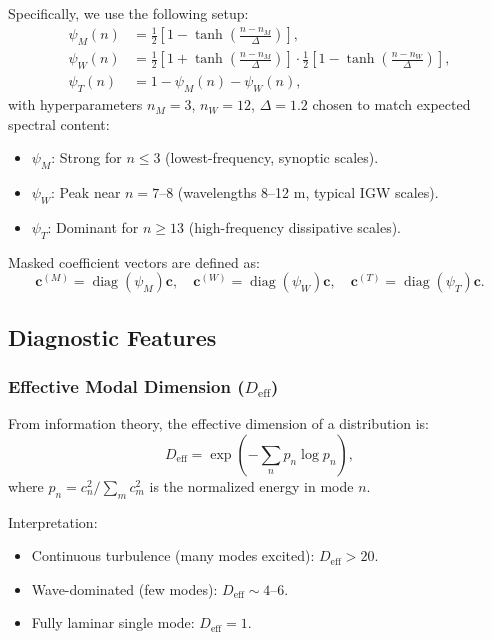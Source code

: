 \documentclass[11pt,a4paper]{article}
\begin{document}
Specifically, we use the following setup:
\begin{align}
\psi_M(n) &= \frac{1}{2}\left[1 - \tanh\left(\frac{n - n_M}{\Delta}\right)\right], \label{eq:psi_m} \\
\psi_W(n) &= \frac{1}{2}\left[1 + \tanh\left(\frac{n - n_M}{\Delta}\right)\right] \cdot \frac{1}{2}\left[1 - \tanh\left(\frac{n - n_W}{\Delta}\right)\right], \label{eq:psi_w} \\
\psi_T(n) &= 1 - \psi_M(n) - \psi_W(n), \label{eq:psi_t}
\end{align}
with hyperparameters $n_M = 3$, $n_W = 12$, $\Delta = 1.2$ chosen to match expected spectral content:
\begin{itemize}
  \item $\psi_M$: Strong for $n \leq 3$ (lowest-frequency, synoptic scales).
  \item $\psi_W$: Peak near $n = 7$--$8$ (wavelengths 8--12 m, typical IGW scales).
  \item $\psi_T$: Dominant for $n \geq 13$ (high-frequency dissipative scales).
\end{itemize}

Masked coefficient vectors are defined as:
\begin{equation}
\mathbf{c}^{(M)} = \operatorname{diag}(\psi_M) \mathbf{c}, \quad \mathbf{c}^{(W)} = \operatorname{diag}(\psi_W) \mathbf{c}, \quad \mathbf{c}^{(T)} = \operatorname{diag}(\psi_T) \mathbf{c}.
\end{equation}

\subsection{Diagnostic Features}
\label{sec:methods:diagnostics}

\subsubsection{Effective Modal Dimension ($D_{\mathrm{eff}}$)}

From information theory, the effective dimension of a distribution is:
\begin{equation}
D_{\mathrm{eff}} = \exp\left( -\sum_n p_n \log p_n \right),
\label{eq:d_eff}
\end{equation}
where $p_n = c_n^2 / \sum_m c_m^2$ is the normalized energy in mode $n$.

Interpretation:
\begin{itemize}
  \item Continuous turbulence (many modes excited): $D_{\mathrm{eff}} > 20$.
  \item Wave-dominated (few modes): $D_{\mathrm{eff}} \sim 4$--$6$.
  \item Fully laminar single mode: $D_{\mathrm{eff}} = 1$.
\end{itemize}
\end{document}
